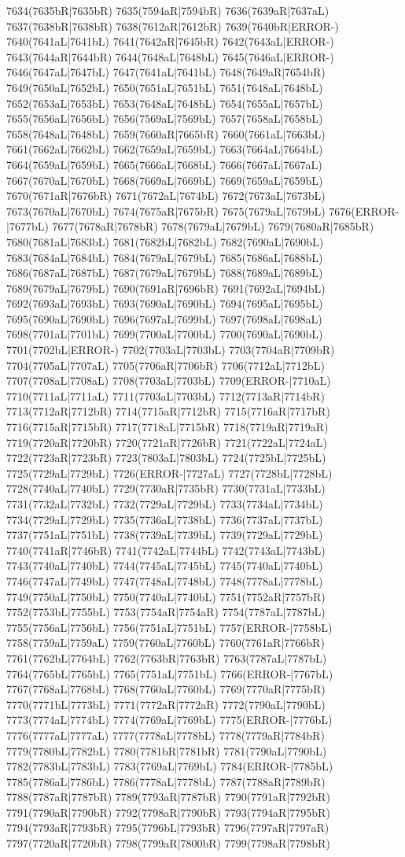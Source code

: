 7634(7635bR|7635bR) 7635(7594aR|7594bR) 7636(7639aR|7637aL) 7637(7638bR|7638bR) 7638(7612aR|7612bR) 7639(7640bR|ERROR-) 7640(7641aL|7641bL) 7641(7642aR|7645bR) 7642(7643aL|ERROR-) 7643(7644aR|7644bR) 7644(7648aL|7648bL) 7645(7646aL|ERROR-) 7646(7647aL|7647bL) 7647(7641aL|7641bL) 7648(7649aR|7654bR) 7649(7650aL|7652bL) 7650(7651aL|7651bL) 7651(7648aL|7648bL) 7652(7653aL|7653bL) 7653(7648aL|7648bL) 7654(7655aL|7657bL) 7655(7656aL|7656bL) 7656(7569aL|7569bL) 7657(7658aL|7658bL) 7658(7648aL|7648bL) 7659(7660aR|7665bR) 7660(7661aL|7663bL) 7661(7662aL|7662bL) 7662(7659aL|7659bL) 7663(7664aL|7664bL) 7664(7659aL|7659bL) 7665(7666aL|7668bL) 7666(7667aL|7667aL) 7667(7670aL|7670bL) 7668(7669aL|7669bL) 7669(7659aL|7659bL) 7670(7671aR|7676bR) 7671(7672aL|7674bL) 7672(7673aL|7673bL) 7673(7670aL|7670bL) 7674(7675aR|7675bR) 7675(7679aL|7679bL) 7676(ERROR-|7677bL) 7677(7678aR|7678bR) 7678(7679aL|7679bL) 7679(7680aR|7685bR) 7680(7681aL|7683bL) 7681(7682bL|7682bL) 7682(7690aL|7690bL) 7683(7684aL|7684bL) 7684(7679aL|7679bL) 7685(7686aL|7688bL) 7686(7687aL|7687bL) 7687(7679aL|7679bL) 7688(7689aL|7689bL) 7689(7679aL|7679bL) 7690(7691aR|7696bR) 7691(7692aL|7694bL) 7692(7693aL|7693bL) 7693(7690aL|7690bL) 7694(7695aL|7695bL) 7695(7690aL|7690bL) 7696(7697aL|7699bL) 7697(7698aL|7698aL) 7698(7701aL|7701bL) 7699(7700aL|7700bL) 7700(7690aL|7690bL) 7701(7702bL|ERROR-) 7702(7703aL|7703bL) 7703(7704aR|7709bR) 7704(7705aL|7707aL) 7705(7706aR|7706bR) 7706(7712aL|7712bL) 7707(7708aL|7708aL) 7708(7703aL|7703bL) 7709(ERROR-|7710aL) 7710(7711aL|7711aL) 7711(7703aL|7703bL) 7712(7713aR|7714bR) 7713(7712aR|7712bR) 7714(7715aR|7712bR) 7715(7716aR|7717bR) 7716(7715aR|7715bR) 7717(7718aL|7715bR) 7718(7719aR|7719aR) 7719(7720aR|7720bR) 7720(7721aR|7726bR) 7721(7722aL|7724aL) 7722(7723aR|7723bR) 7723(7803aL|7803bL) 7724(7725bL|7725bL) 7725(7729aL|7729bL) 7726(ERROR-|7727aL) 7727(7728bL|7728bL) 7728(7740aL|7740bL) 7729(7730aR|7735bR) 7730(7731aL|7733bL) 7731(7732aL|7732bL) 7732(7729aL|7729bL) 7733(7734aL|7734bL) 7734(7729aL|7729bL) 7735(7736aL|7738bL) 7736(7737aL|7737bL) 7737(7751aL|7751bL) 7738(7739aL|7739bL) 7739(7729aL|7729bL) 7740(7741aR|7746bR) 7741(7742aL|7744bL) 7742(7743aL|7743bL) 7743(7740aL|7740bL) 7744(7745aL|7745bL) 7745(7740aL|7740bL) 7746(7747aL|7749bL) 7747(7748aL|7748bL) 7748(7778aL|7778bL) 7749(7750aL|7750bL) 7750(7740aL|7740bL) 7751(7752aR|7757bR) 7752(7753bL|7755bL) 7753(7754aR|7754aR) 7754(7787aL|7787bL) 7755(7756aL|7756bL) 7756(7751aL|7751bL) 7757(ERROR-|7758bL) 7758(7759aL|7759aL) 7759(7760aL|7760bL) 7760(7761aR|7766bR) 7761(7762bL|7764bL) 7762(7763bR|7763bR) 7763(7787aL|7787bL) 7764(7765bL|7765bL) 7765(7751aL|7751bL) 7766(ERROR-|7767bL) 7767(7768aL|7768bL) 7768(7760aL|7760bL) 7769(7770aR|7775bR) 7770(7771bL|7773bL) 7771(7772aR|7772aR) 7772(7790aL|7790bL) 7773(7774aL|7774bL) 7774(7769aL|7769bL) 7775(ERROR-|7776bL) 7776(7777aL|7777aL) 7777(7778aL|7778bL) 7778(7779aR|7784bR) 7779(7780bL|7782bL) 7780(7781bR|7781bR) 7781(7790aL|7790bL) 7782(7783bL|7783bL) 7783(7769aL|7769bL) 7784(ERROR-|7785bL) 7785(7786aL|7786bL) 7786(7778aL|7778bL) 7787(7788aR|7789bR) 7788(7787aR|7787bR) 7789(7793aR|7787bR) 7790(7791aR|7792bR) 7791(7790aR|7790bR) 7792(7798aR|7790bR) 7793(7794aR|7795bR) 7794(7793aR|7793bR) 7795(7796bL|7793bR) 7796(7797aR|7797aR) 7797(7720aR|7720bR) 7798(7799aR|7800bR) 7799(7798aR|7798bR) 